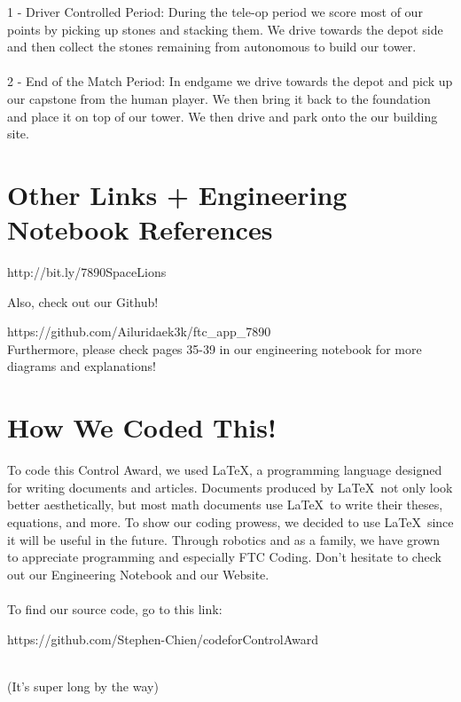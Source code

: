 \documentclass{article}[12pt]
\begin{document}
	{\color{Aquamarine}1 - Driver Controlled Period:} During the tele-op period we score most of our points by picking up stones and stacking them. We drive towards the depot side and then collect the stones remaining from autonomous to build our tower.\\ \\

	{\color{purple}2 - End of the Match Period:} In endgame we drive towards the depot and pick up our capstone from the human player. We then bring it back to the foundation and place it on top of our tower. We then drive and park onto the our building site.


\section[Other Links + Engineering Notebook References] {Other Links + Engineering Notebook References}
\begin{huge}

http://bit.ly/7890SpaceLions

Also, check out our Github! 

{https://github.com/Ailuridaek3k/ftc\_app\_7890} \\ 
{Furthermore, please check pages 35-39 in our engineering notebook for more diagrams and explanations!}
\center

\newpage
\newpage
\end{huge}



\section[How We Coded This!] {How We Coded This!}

To code this Control Award, we used \LaTeX, a programming language designed for writing documents and articles. Documents produced by \LaTeX\  not only look better aesthetically, but most math documents use \LaTeX\  to write their theses, equations, and more. To show our coding prowess, we decided to use \LaTeX\, since it will be useful in the future. Through robotics and as a family, we have grown to appreciate programming and especially FTC Coding. Don't hesitate to check out our Engineering Notebook and our Website. 
\\ \\
To find our source code, go to this link:
\begin{huge} \indent \indent \newline \newline
https://github.com/Stephen-Chien/codeforControlAward
\end{huge}
\\(It's super long by the way)

\center
\end{document}
